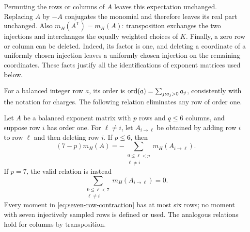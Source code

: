 Permuting the rows or columns of $A$ leaves this expectation unchanged.
Replacing $A$ by $-A$ conjugates the monomial and therefore leaves its real
part unchanged.  Also $m_H(A^{\mathsf T})=m_H(A)$: transposition exchanges
the two injections and interchanges the equally weighted choices of $K$.
Finally, a zero row or column can be deleted.  Indeed, its factor is one,
and deleting a coordinate of a uniformly chosen injection leaves a
uniformly chosen injection on the remaining coordinates.  These facts
justify all the identifications of exponent matrices used below.

For a balanced integer row $a$, its order is
$\operatorname{ord}(a)=\sum_{j:a_j>0}a_j$, consistently with the notation for charges.
The following relation eliminates any row of order one.

\begin{lemma}
\label{lem:contraction}
Let $A$ be a balanced exponent matrix with $p$ rows and $q\leq6$ columns,
and suppose row $i$ has order one.  For $\ell\ne i$, let
$A_{i\to\ell}$ be obtained by adding row $i$ to row $\ell$ and then
deleting row $i$.  If $p\leq6$, then
\begin{equation}
  (7-p)m_H(A)
    =-\sum_{\substack{0\leq\ell<p\\\ell\ne i}}
        m_H(A_{i\to\ell}).
  \label{eq:injective-contraction}
\end{equation}
If $p=7$, the valid relation is instead
\begin{equation}
  \sum_{\substack{0\leq\ell<7\\\ell\ne i}}
      m_H(A_{i\to\ell})=0.
  \label{eq:seven-row-contraction}
\end{equation}
Every moment in \eqref{eq:seven-row-contraction} has at most six rows;
no moment with seven injectively sampled rows is defined or used.
The analogous relations hold for columns by transposition.
\end{lemma}

